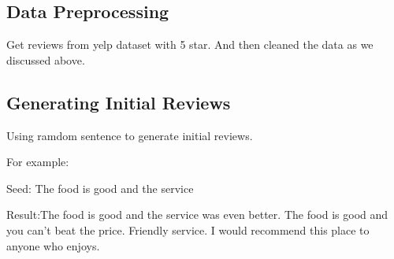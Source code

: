 \documentclass[conference]{IEEEtran}
\begin{document}
\subsection{Data Preprocessing}
\par Get reviews from yelp dataset with 5 star. And then cleaned the data as we discussed above.
\subsection{Generating Initial Reviews}
\par Using ramdom sentence to generate initial reviews.
\par For example:
\par Seed: The food is good and the service
\par Result:The food is good and the service was even better. The food is good and you can't beat the price. Friendly service. I would recommend this place to anyone who enjoys.
\end{document}
